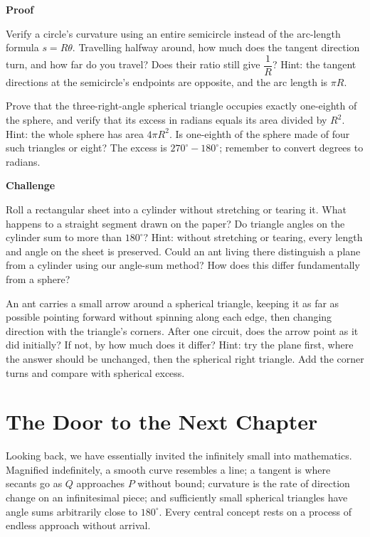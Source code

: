 \textbf{Proof}

\begin{sikao}
  \item Verify a circle's curvature using an entire semicircle instead of the arc-length formula $s=R\theta$. Travelling halfway around, how much does the tangent direction turn, and how far do you travel? Does their ratio still give $\dfrac{1}{R}$? Hint: the tangent directions at the semicircle's endpoints are opposite, and the arc length is $\pi R$.
  \item Prove that the three-right-angle spherical triangle occupies exactly one-eighth of the sphere, and verify that its excess in radians equals its area divided by $R^2$. Hint: the whole sphere has area $4\pi R^2$. Is one-eighth of the sphere made of four such triangles or eight? The excess is $270^\circ - 180^\circ$; remember to convert degrees to radians.
\end{sikao}

\textbf{Challenge}

\begin{sikao}
  \item Roll a rectangular sheet into a cylinder without stretching or tearing it. What happens to a straight segment drawn on the paper? Do triangle angles on the cylinder sum to more than $180^\circ$? Hint: without stretching or tearing, every length and angle on the sheet is preserved. Could an ant living there distinguish a plane from a cylinder using our angle-sum method? How does this differ fundamentally from a sphere?
  \item An ant carries a small arrow around a spherical triangle, keeping it as far as possible pointing forward without spinning along each edge, then changing direction with the triangle's corners. After one circuit, does the arrow point as it did initially? If not, by how much does it differ? Hint: try the plane first, where the answer should be unchanged, then the spherical right triangle. Add the corner turns and compare with spherical excess.
\end{sikao}

\section*{The Door to the Next Chapter}

Looking back, we have essentially invited the infinitely small into mathematics. Magnified indefinitely, a smooth curve resembles a line; a tangent is where secants go as $Q$ approaches $P$ without bound; curvature is the rate of direction change on an infinitesimal piece; and sufficiently small spherical triangles have angle sums arbitrarily close to $180^\circ$. Every central concept rests on a process of endless approach without arrival.

